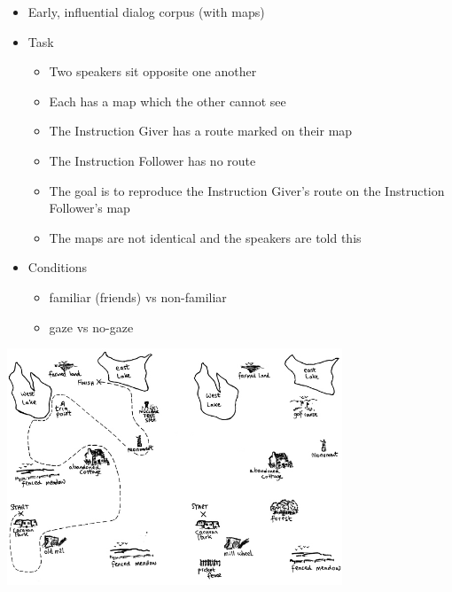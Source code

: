 \documentclass[a4paper,landscape,headrule,footrule,dvips]{foils}
\begin{document}
\begin{CJK}{UTF8}{min}
\begin{itemize}
\item Early, influential dialog corpus (with maps)
\item Task
  \begin{itemize}
  \item Two speakers sit opposite one another
  \item Each has a map which the other cannot see
  \item The Instruction Giver has a route marked on their map
  \item The Instruction Follower has no route
  \item The goal is to reproduce the Instruction Giver's route on the Instruction Follower's map
  \item The maps are not identical and the speakers are told this
  \end{itemize}
\item Conditions
  \begin{itemize}
  \item familiar (friends) vs non-familiar
  \item gaze vs no-gaze
  \end{itemize}
\end{itemize}


\begin{center}
  \includegraphics[width=0.75\textwidth]{include/maps}
\end{center}



\end{CJK}
\end{document}
